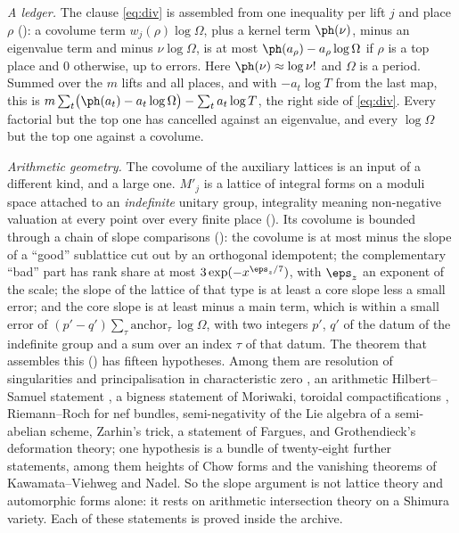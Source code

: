 \emph{A ledger.} The clause \eqref{eq:div} is assembled from one inequality per lift $j$ and
place $\rho$ \lvP{} (): a covolume term
$w_j(\rho)\log\Omega$, plus a kernel term $\ph(\nu)$, minus an eigenvalue term and minus
$\nu\log\Omega$, is at most $\ph(a_\rho)-a_\rho\log\Omega$ if $\rho$ is a top place and $0$
otherwise, up to errors. Here $\ph(\nu)\approx\log\nu!$ and $\Omega$ is a period. Summed over
the $m$ lifts and all places, and with $-a_t\log T$ from the last map, this is
$m\sum_t\bigl(\ph(a_t)-a_t\log\Omega\bigr)-\sum_ta_t\log T$, the right side of \eqref{eq:div}.
Every factorial but the top one has cancelled against an eigenvalue, and every
$\log\Omega$ but the top one against a covolume.

\emph{Arithmetic geometry.} The covolume of the auxiliary lattices is an input of a different
kind, and a large one. $M'_j$ is a lattice of integral forms on a moduli space attached to an
\emph{indefinite} unitary group, integrality meaning non-negative valuation at every point over
every finite place \lvS{} (). Its covolume is bounded through a chain of slope
comparisons \lvS{} (): the covolume is at most minus the slope of a ``good''
sublattice cut out by an orthogonal idempotent; the complementary ``bad'' part has rank share
at most $3\exp(-x^{\eps_z/7})$, with $\eps_z$ an exponent of the scale; the slope of the lattice
of that type is at least a core slope
less a small error; and the core slope is at least minus a main term, which is within a small
error of $(p'-q')\sum_\tau\mathrm{anchor}_\tau\,\log\Omega$, with two integers $p'$, $q'$ of the
datum of the indefinite group and a sum over an index $\tau$ of that datum. The theorem that assembles this
\lvS{} () has fifteen hypotheses. Among them are resolution of
singularities and
principalisation in characteristic zero \cite{hironaka1964}, an arithmetic Hilbert--Samuel
statement \cite{gilletsoule1992,zhang1995,abbesbouche1995}, a bigness statement of Moriwaki,
toroidal compactifications \cite{faltingschai1990,lan2013}, Riemann--Roch for nef bundles,
semi-negativity of the Lie algebra of a semi-abelian scheme, Zarhin's trick, a statement of
Fargues, and Grothendieck's deformation theory; one hypothesis is a bundle of twenty-eight
further statements, among them heights of Chow forms and the vanishing theorems of
Kawamata--Viehweg and Nadel. So the slope argument
is not lattice theory and automorphic forms alone: it rests on arithmetic intersection theory
on a Shimura variety. Each of these statements is proved inside the archive.


